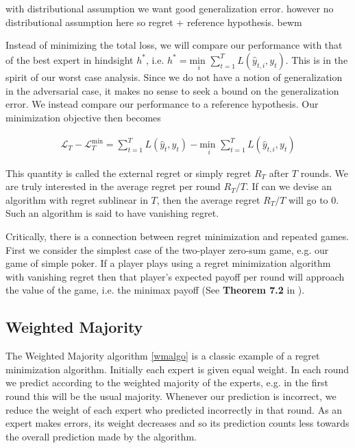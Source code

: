 \documentclass{article}
\begin{document}
with distributional assumption we want good generalization error. however no distributional assumption here so regret + reference hypothesis. bewm

Instead of minimizing the total loss, we will compare our performance with that of the best expert in hindsight $h^*$, i.e. $h^* = \underset{i}{\text{min }} \sum_{t=1}^T L(\hat y_{t,i}, y_t)$. This is in the spirit of our worst case analysis. Since we do not have a notion of generalization in the adversarial case, it makes no sense to seek a bound on the generalization error. We instead compare our performance to a reference hypothesis. Our minimization objective then becomes

\begin{align*}
\mathcal{L}_T - \mathcal{L}_T^{\text{min}} = \sum_{t=1}^T L(\hat y_t, y_t) - \underset{i}{\text{min }} \sum_{t=1}^T L(\hat y_{t,i}, y_t)
\end{align*}

This quantity is called the external regret or simply regret $R_T$ after $T$ rounds. We are truly interested in the average regret per round $R_T/T$. If can we devise an algorithm with regret sublinear in $T$, then the average regret $R_T/T$ will go to 0. Such an algorithm is said to have vanishing regret.

Critically, there is a connection between regret minimization and repeated games. First we consider the simplest case of the two-player zero-sum game, e.g. our game of simple poker. If a player plays using a regret minimization algorithm with vanishing regret then that player's expected payoff per round will approach the value of the game, i.e. the minimax payoff (See \textbf{Theorem 7.2} in \cite{cesa2006prediction}).

\subsection{Weighted Majority}

The Weighted Majority algorithm \autoref{wmalgo} \cite{littlestone1994weighted} is a classic example of a regret minimization algorithm. Initially each expert is given equal weight. In each round we predict according to the weighted majority of the experts, e.g. in the first round this will be the usual majority. Whenever our prediction is incorrect, we reduce the weight of each expert who predicted incorrectly in that round. As an expert makes errors, its weight decreases and so its prediction counts less towards the overall prediction made by the algorithm.
\end{document}
